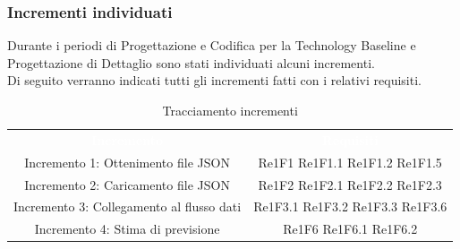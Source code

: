 \subsubsection{Incrementi individuati}
Durante i periodi di Progettazione e Codifica per la Technology Baseline e Progettazione di Dettaglio sono stati individuati alcuni incrementi. \\
Di seguito verranno indicati tutti gli incrementi fatti con i relativi requisiti.

\begin{table}[H]
\centering\renewcommand{\arraystretch}{1.5}
\caption{Tracciamento incrementi}
\vspace{0.2cm}
\begin{tabular}{ c c }
\rowcolor{redafk}
\textcolor{white}{\textbf{Incremento}} & \textcolor{white}{\textbf{Requisiti}}\\
Incremento 1: Ottenimento file JSON			& Re1F1 \newline Re1F1.1  \newline Re1F1.2 \newline Re1F1.5\\
Incremento 2: Caricamento file JSON			& Re1F2 \newline Re1F2.1 \newline Re1F2.2 \newline Re1F2.3\\
Incremento 3: Collegamento al flusso dati	& Re1F3.1 \newline Re1F3.2 \newline Re1F3.3 \newline Re1F3.6 \\
Incremento 4: Stima di previsione			& Re1F6 \newline Re1F6.1 \newline Re1F6.2\\
\end{tabular}
\end{table}